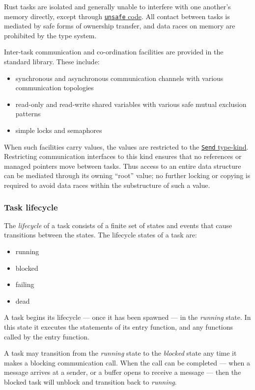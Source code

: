 \documentclass[]{article}
\begin{document}
Rust tasks are isolated and generally unable to interfere with one
another's memory directly, except through
\hyperref[unsafe-functions]{\texttt{unsafe} code}. All contact between
tasks is mediated by safe forms of ownership transfer, and data races on
memory are prohibited by the type system.

Inter-task communication and co-ordination facilities are provided in
the standard library. These include:

\begin{itemize}
\itemsep1pt\parskip0pt
\item
  synchronous and asynchronous communication channels with various
  communication topologies
\item
  read-only and read-write shared variables with various safe mutual
  exclusion patterns
\item
  simple locks and semaphores
\end{itemize}

When such facilities carry values, the values are restricted to the
\hyperref[type-kinds]{\texttt{Send} type-kind}. Restricting
communication interfaces to this kind ensures that no references or
managed pointers move between tasks. Thus access to an entire data
structure can be mediated through its owning ``root'' value; no further
locking or copying is required to avoid data races within the
substructure of such a value.

\subsubsection{Task lifecycle}\label{task-lifecycle}

The \emph{lifecycle} of a task consists of a finite set of states and
events that cause transitions between the states. The lifecycle states
of a task are:

\begin{itemize}
\itemsep1pt\parskip0pt
\item
  running
\item
  blocked
\item
  failing
\item
  dead
\end{itemize}

A task begins its lifecycle --- once it has been spawned --- in the
\emph{running} state. In this state it executes the statements of its
entry function, and any functions called by the entry function.

A task may transition from the \emph{running} state to the
\emph{blocked} state any time it makes a blocking communication call.
When the call can be completed --- when a message arrives at a sender,
or a buffer opens to receive a message --- then the blocked task will
unblock and transition back to \emph{running}.
\end{document}
